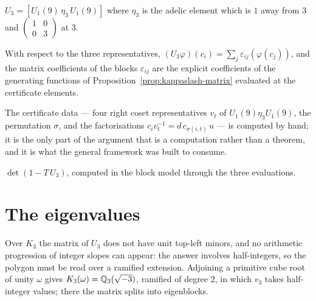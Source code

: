 \begin{definition}
  \label{def:u3}
  \leanok
  $U_3 = [U_1(9)\, \eta_3\, U_1(9)]$ where $\eta_3$ is the adelic element which is $1$ away from
  $3$ and $\left(\begin{smallmatrix}1&0\\0&3\end{smallmatrix}\right)$ at $3$.
\end{definition}

\begin{theorem}
  \label{thm:u3-matrix}
  \leanok
  With respect to the three representatives, $(U_3\varphi)(c_i) = \sum_j \varepsilon_{ij}
  (\varphi(c_j))$, and the matrix coefficients of the blocks $\varepsilon_{ij}$ are the explicit
  coefficients of the generating functions of Proposition~\ref{prop:kappaslash-matrix} evaluated
  at the certificate elements.
\end{theorem}

The certificate data --- four right coset representatives $v_t$ of $U_1(9)\eta_3 U_1(9)$, the
permutation $\sigma$, and the factorisations $c_i v_t^{-1} = d\, c_{\sigma(i,t)}\, u$ --- is
computed by hand; it is the only part of the argument that is a computation rather than a
theorem, and it is what the general framework was built to consume.

\begin{definition}
  \label{def:u3-det}
  \leanok
  $\det(1 - T\,U_3)$, computed in the block model through the three evaluations.
\end{definition}

\section{The eigenvalues}

Over $K_3$ the matrix of $U_3$ does not have unit top-left minors, and no arithmetic progression
of integer slopes can appear: the answer involves half-integers, so the polygon must be read over
a ramified extension.  Adjoining a primitive cube root of unity $\omega$ gives $K_3(\omega) =
\mathbb{Q}_3(\sqrt{-3})$, ramified of degree $2$, in which $v_3$ takes half-integer values; there the
matrix splits into eigenblocks.

